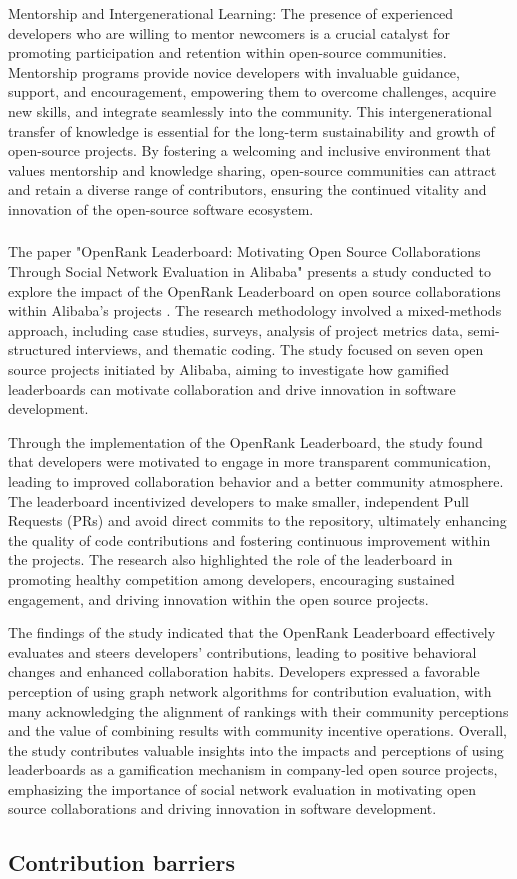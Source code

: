 Mentorship and Intergenerational Learning: The presence of experienced developers who are willing to mentor newcomers is a crucial catalyst for promoting participation and retention within open-source communities. Mentorship programs provide novice developers with invaluable guidance, support, and encouragement, empowering them to overcome challenges, acquire new skills, and integrate seamlessly into the community. This intergenerational transfer of knowledge is essential for the long-term sustainability and growth of open-source projects. By fostering a welcoming and inclusive environment that values mentorship and knowledge sharing, open-source communities can attract and retain a diverse range of contributors, ensuring the continued vitality and innovation of the open-source software ecosystem.



\subsubsection{}

The paper "OpenRank Leaderboard: Motivating Open Source Collaborations Through Social Network Evaluation in Alibaba" presents a study conducted to explore the impact of the OpenRank Leaderboard on open source collaborations within Alibaba's projects \cite{07zhao2024openrank}. The research methodology involved a mixed-methods approach, including case studies, surveys, analysis of project metrics data, semi-structured interviews, and thematic coding. The study focused on seven open source projects initiated by Alibaba, aiming to investigate how gamified leaderboards can motivate collaboration and drive innovation in software development.

Through the implementation of the OpenRank Leaderboard, the study found that developers were motivated to engage in more transparent communication, leading to improved collaboration behavior and a better community atmosphere. The leaderboard incentivized developers to make smaller, independent Pull Requests (PRs) and avoid direct commits to the repository, ultimately enhancing the quality of code contributions and fostering continuous improvement within the projects. The research also highlighted the role of the leaderboard in promoting healthy competition among developers, encouraging sustained engagement, and driving innovation within the open source projects.

The findings of the study indicated that the OpenRank Leaderboard effectively evaluates and steers developers' contributions, leading to positive behavioral changes and enhanced collaboration habits. Developers expressed a favorable perception of using graph network algorithms for contribution evaluation, with many acknowledging the alignment of rankings with their community perceptions and the value of combining results with community incentive operations. Overall, the study contributes valuable insights into the impacts and perceptions of using leaderboards as a gamification mechanism in company-led open source projects, emphasizing the importance of social network evaluation in motivating open source collaborations and driving innovation in software development.


\subsection{Contribution barriers}



\clearpage
